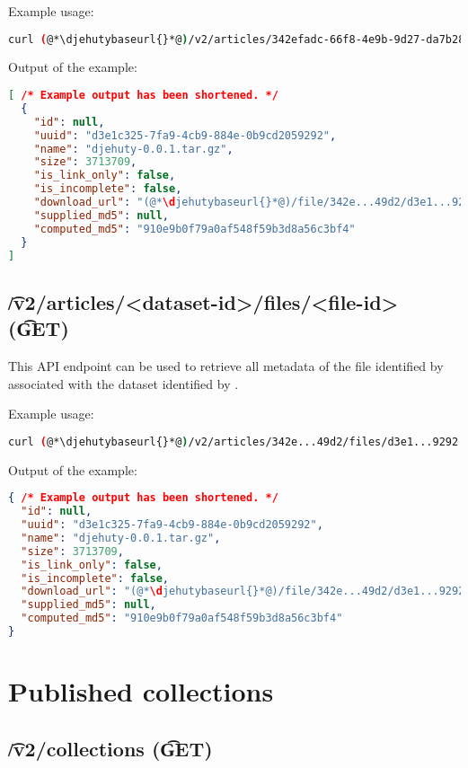   Example usage:
\begin{lstlisting}[language=bash]
curl (@*\djehutybaseurl{}*@)/v2/articles/342efadc-66f8-4e9b-9d27-da7b28b849d2/files
\end{lstlisting}

  Output of the example:
\begin{lstlisting}[language=JSON]
[ /* Example output has been shortened. */
  {
    "id": null,
    "uuid": "d3e1c325-7fa9-4cb9-884e-0b9cd2059292",
    "name": "djehuty-0.0.1.tar.gz",
    "size": 3713709,
    "is_link_only": false,
    "is_incomplete": false,
    "download_url": "(@*\djehutybaseurl{}*@)/file/342e...49d2/d3e1...9292",
    "supplied_md5": null,
    "computed_md5": "910e9b0f79a0af548f59b3d8a56c3bf4"
  }
]
\end{lstlisting}

\subsection{\t{/v2/articles/<dataset-id>/files/<file-id>} (\t{GET})}

  This API endpoint can be used to retrieve all metadata of the file
  identified by  associated with the dataset identified
  by .

  Example usage:
\begin{lstlisting}[language=bash]
curl (@*\djehutybaseurl{}*@)/v2/articles/342e...49d2/files/d3e1...9292 | jq
\end{lstlisting}

  Output of the example:
\begin{lstlisting}[language=JSON]
{ /* Example output has been shortened. */
  "id": null,
  "uuid": "d3e1c325-7fa9-4cb9-884e-0b9cd2059292",
  "name": "djehuty-0.0.1.tar.gz",
  "size": 3713709,
  "is_link_only": false,
  "is_incomplete": false,
  "download_url": "(@*\djehutybaseurl{}*@)/file/342e...49d2/d3e1...9292",
  "supplied_md5": null,
  "computed_md5": "910e9b0f79a0af548f59b3d8a56c3bf4"
}
\end{lstlisting}

\section{Published collections}

\subsection{\t{/v2/collections} (\t{GET})}
\label{sec:v2-collections}

